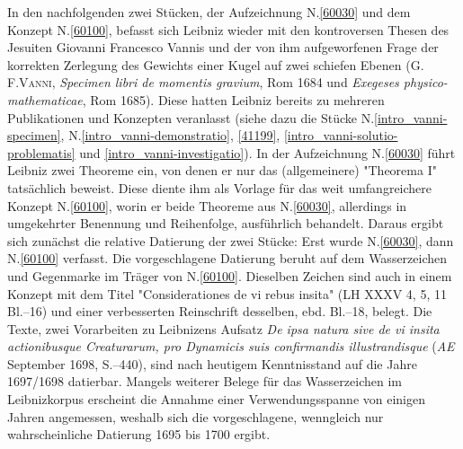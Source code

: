 \begin{ledgroup}
\footnotesize
\pstart
\noindent
In den nachfolgenden zwei Stücken, der Aufzeichnung N.\;\ref{60030} und dem Konzept N.\;\ref{60100},
befasst sich Leibniz wieder mit den kontroversen Thesen des Jesuiten
Giovanni Francesco Vannis
und der von ihm aufgeworfenen Frage der korrekten Zerlegung des Gewichts einer Kugel auf zwei schiefen Ebenen (\textsc{G.\,F.\;Vanni}, \cite{01995}\textit{Specimen libri de momentis gravium}, Rom 1684 und  \cite{02000}\textit{Exegeses physico-mathematicae}, Rom 1685). 
Diese hatten Leibniz bereits zu mehreren Publikationen und Konzepten veranlasst (siehe dazu die Stücke N.\;\ref{intro_vanni-specimen}, N.\;\ref{intro_vanni-demonstratio}, \ref{41199}, \ref{intro_vanni-solutio-problematis} und \ref{intro_vanni-investigatio}).
In der Aufzeichnung N.\;\ref{60030} führt Leibniz zwei Theoreme ein, von denen er nur das (allgemeinere) "Theorema I" tatsächlich beweist. Diese diente ihm als Vorlage für das weit umfangreichere Konzept N.\;\ref{60100}, worin er beide Theoreme aus N.\;\ref{60030}, allerdings in umgekehrter Benennung und Reihenfolge, ausführlich behandelt.
Daraus ergibt sich zunächst die relative Datierung der zwei Stücke: Erst wurde N.\;\ref{60030}, dann N.\;\ref{60100} verfasst.
\pend
\pstart
Die vorgeschlagene Datierung beruht auf dem Wasserzeichen und Gegenmarke im Träger von N.\;\ref{60100}. Dieselben Zeichen sind auch  in einem Konzept mit dem Titel "Considerationes de vi rebus insita" (LH XXXV 4, 5, 11 Bl.--16) und einer verbesserten Reinschrift desselben, ebd. Bl.--18, belegt. Die Texte, zwei Vorarbeiten zu Leibnizens Aufsatz \cite{02063}\textit{De ipsa natura sive de vi insita actionibusque Creaturarum, pro Dynamicis suis confirmandis illustrandisque} (\cite{01023}\textit{AE} September 1698, S.--440), sind nach heutigem Kenntnisstand auf die Jahre 1697/1698 datierbar.
Mangels weiterer Belege für das Wasserzeichen im Leibnizkorpus erscheint die Annahme einer Verwendungsspanne von einigen Jahren angemessen, weshalb sich die vorgeschlagene, wenngleich nur wahrscheinliche Datierung 1695 bis 1700 ergibt.
\pend


\end{ledgroup}
